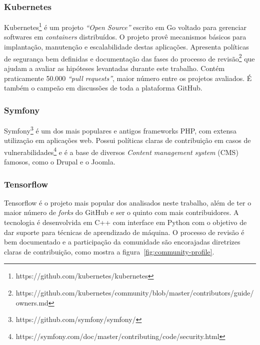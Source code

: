 \documentclass[12pt,openany,oneside,a4paper,english,brazil]{abntbibufjf}
\begin{document}
  \subsubsection{Kubernetes}

  Kubernetes\footnote{https://github.com/kubernetes/kubernetes} é um projeto \textit{``Open Source''} escrito em Go voltado para gerenciar softwares em \textit{containers} distribuídos. O projeto provê mecanismos básicos para implantação, manutenção e escalabilidade destas aplicações. Apresenta políticas de segurança bem definidas e documentação das fases do processo de revisão\footnote{https://github.com/kubernetes/community/blob/master/contributors/guide/owners.md} que ajudam a avaliar as hipóteses levantadas durante este trabalho. Contém praticamente 50.000 \textit{``pull requests''}, maior número entre os projetos avaliados. É também o campeão em discussões de toda a plataforma GitHub.

\subsubsection{Symfony}
Symfony\footnote{https://github.com/symfony/symfony/} é um dos mais populares e antigos frameworks PHP, com extensa utilização em aplicações web. Possui políticas claras de contribuição em casos de vulnerabilidades\footnote{https://symfony.com/doc/master/contributing/code/security.html} e é a base de diversos  \textit{Content management system} (CMS) famosos, como o Drupal e o Joomla.

\subsubsection{Tensorflow}

Tensorflow é o projeto mais popular dos analisados neste trabalho, além de ter o maior número de \textit{forks} do GitHub e ser o quinto com mais contribuidores. A tecnologia é desenvolvida em C++ com interface em Python com o objetivo de dar suporte para técnicas de aprendizado de máquina. O processo de revisão é bem documentado e a participação da comunidade são encorajadas diretrizes claras de contribuição, como mostra a figura~\ref{fig:community-profile}.
\end{document}

